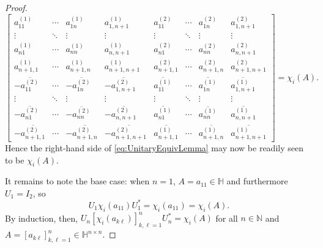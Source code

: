 \documentclass[10pt,a4paper]{amsart}
\def\HH{\mathbb{H}}
\def\NN{\mathbb{N}}
\def\x{\chi}
\begin{document}
\begin{proof}
\[        \begin{bmatrix} a_{11}^{(1)} & \cdots & a_{1n}^{(1)} & a_{1,n+1}^{(1)} &  a_{11}^{(2)} & \cdots & a_{1n}^{(2)} & a_{1,n+1}^{(2)} \\[6pt] \vdots & \ddots & \vdots & \vdots & \vdots & \ddots & \vdots & \vdots \\[6pt] a_{n1}^{(1)} & \cdots & a_{nn}^{(1)} & a_{n,n+1}^{(1)} & a_{n1}^{(2)} & \cdots & a_{nn}^{(2)} & a_{n,n+1}^{(2)} \\[6pt] a_{n+1,1}^{(1)} & \cdots & a_{n+1,n}^{(1)} & a_{n+1,n+1}^{(1)} & a_{n+1,1}^{(2)} & \cdots & a_{n+1,n}^{(2)} & a_{n+1,n+1}^{(2)} \\[6pt] -\overline{a_{11}^{(2)}} & \cdots & -\overline{a_{1n}^{(2)}} & -\overline{a_{1,n+1}^{(2)}} & \overline{a_{11}^{(1)}} & \cdots & \overline{a_{1n}^{(1)}} & \overline{a_{1,n+1}^{(1)}} \\[6pt] \vdots & \ddots & \vdots & \vdots & \vdots & \ddots & \vdots & \vdots \\[6pt] -\overline{a_{n1}^{(2)}} & \cdots & -\overline{a_{nn}^{(2)}} & -\overline{a_{n,n+1}^{(2)}} & \overline{a_{n1}^{(1)}} & \cdots & \overline{a_{nn}^{(1)}} & \overline{a_{n,n+1}^{(1)}} \\[6pt] -\overline{a_{n+1,1}^{(2)}} & \cdots & -\overline{a_{n+1,n}^{(2)}} & -\overline{a_{n+1,n+1}^{(2)}} & \overline{a_{n+1,1}^{(1)}} & \cdots & \overline{a_{n+1,n}^{(1)}} & \overline{a_{n+1,n+1}^{(1)}} \end{bmatrix} = \x_i(A).
    \]
    Hence the right-hand side of \eqref{eq:UnitaryEquivLemma} may now be readily seen to be \(\x_i(A)\).

    It remains to note the base case: when \(n=1\), \(A = a_{11} \in \HH\) and furthermore \(U_1 = I_2\), so
    \[
        U_1 \x_i(a_{11}) U_1^* = \x_i(a_{11}) = \x_i(A).
    \]
    By induction, then, \(U_n [\x_i(a_{k\ell})]_{k,\ell=1}^n U_n^* = \x_i(A)\) for all \(n \in \NN\) and \(A = [a_{k\ell}]_{k,\ell=1}^n \in \HH^{n\times n}\).
\end{proof}
\end{document}
